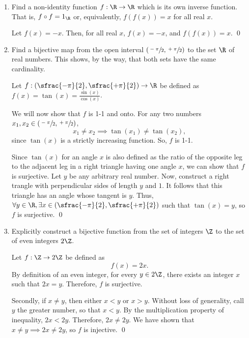 \documentclass[letterpaper]{article}
\begin{document}
\begin{enumerate}
\item Find a non-identity function $f:\R \to \R$ which is its own inverse function. That is, $f \circ f = 1_\R$ or, equivalently, $f(f(x))=x$ for all real $x$. 
\begin{example*}
Let $f(x)=-x$. Then, for all real $x$, $f(x)=-x$, and $f(f(x))=x$. \qed
\end{example*}

\setcounter{enumi}{4}
\item Find a bijective map from the open interval $(\sfrac{-\pi}{2}, \sfrac{+\pi}{2})$ to the set $\R$ of real numbers. This shows, by the way, that both sets have the same cardinality.
\begin{example*}
Let $f:(\sfrac{-\pi}{2}, \sfrac{+\pi}{2}) \to \R$ be defined as $f(x) = \tan(x) = \frac{\sin(x)}{\cos(x)}$. 

We will now show that $f$ is 1-1 and onto. For any two numbers $x_1, x_2 \in (\sfrac{-\pi}{2}, \sfrac{+\pi}{2})$,
$$x_1 \neq x_2 \implies \tan(x_1) \neq \tan(x_2),$$
since $\tan(x)$ is a strictly increasing function. So, $f$ is 1-1. 

Since $\tan(x)$ for an angle $x$ is also defined as the ratio of the opposite leg to the adjacent leg in a right triangle having one angle $x$, we can show that $f$ is surjective. Let $y$ be any arbitrary real number. Now, construct a right trangle with perpendicular sides of length $y$ and $1$. It follows that this triangle has an angle whose tangent is $y$. Thus, $\forall y \in \R, \exists x \in (\sfrac{-\pi}{2}, \sfrac{+\pi}{2})$ such that $\tan(x)=y$, so $f$ is surjective. \qed 
\end{example*}

\item Explicitly construct a bijective function from the set of integers $\Z$ to the set of even integers $2\Z$. 
\begin{example*}
Let $f:\Z \to 2\Z$ be defined as 
$$f(x) = 2x.$$
By definition of an even integer, for every $y \in 2\Z$, there exists an integer $x$ such that $2x=y$. Therefore, $f$ is surjective.

Secondly, if $x \neq y$, then either $x < y$ or $x > y$. Without loss of generality, call $y$ the greater number, so that $x < y$. By the multiplication property of inequality, $2x < 2y$. Therefore, $2x \neq 2y$. We have shown that $x\neq y \implies 2x \neq 2y$, so $f$ is injective. \qed
\end{example*}
\end{enumerate}
\end{document}
